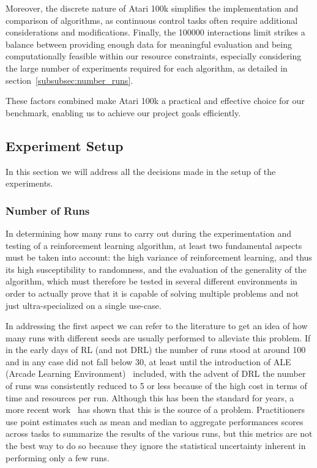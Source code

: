 Moreover, the discrete nature of Atari 100k simplifies the implementation and comparison of algorithms, as continuous control tasks often require additional considerations and modifications. Finally, the \num{100000} interactions limit strikes a balance between providing enough data for meaningful evaluation and being computationally feasible within our resource constraints, especially considering the large number of experiments required for each algorithm, as detailed in section~\vref{subsubsec:number_runs}.

These factors combined make Atari 100k a practical and effective choice for our benchmark, enabling us to achieve our project goals efficiently.


\subsection{Experiment Setup}
\label{subsec:experiment_setup}
In this section we will address all the decisions made in the setup of the experiments.

\subsubsection{Number of Runs}
\label{subsubsec:number_runs}

In determining how many runs to carry out during the experimentation and testing of a reinforcement learning algorithm, at least two fundamental aspects must be taken into account: the high variance of reinforcement learning, and thus its high susceptibility to randomness, and the evaluation of the generality of the algorithm, which must therefore be tested in several different environments in order to actually prove that it is capable of solving multiple problems and not just ultra-specialized on a single use-case.

In addressing the first aspect we can refer to the literature to get an idea of how many runs with different seeds are usually performed to alleviate this problem. If in the early days of RL (and not DRL) the number of runs stood at around 100 and in any case did not fall below 30, at least until the introduction of ALE (Arcade Learning Environment)~\cite{bellemare:ale} included, with the advent of DRL the number of runs was consistently reduced to 5 or less because of the high cost in terms of time and resources per run. Although this has been the standard for years, a more recent work~\cite{agarwal:statistical_precipice} has shown that this is the source of a problem. Practitioners use point estimates such as mean and median to aggregate performances  scores across tasks to summarize the results of the various runs, but this metrics are not the best way to do so because they ignore the statistical uncertainty inherent in performing only a few runs.

